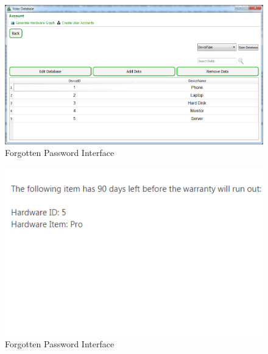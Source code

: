 \begin{figure}[H]
    \includegraphics[width=\textwidth]{./Testing/Images/AddedDevice.png}
    \caption{Forgotten Password Interface} \label{fig:AddedDevice}
\end{figure}


\begin{figure}[H]
    \includegraphics[width=\textwidth]{./Testing/Images/EmailExpiredHardware.png}
    \caption{Forgotten Password Interface} \label{fig:EmailExpiredHardware}
\end{figure}

